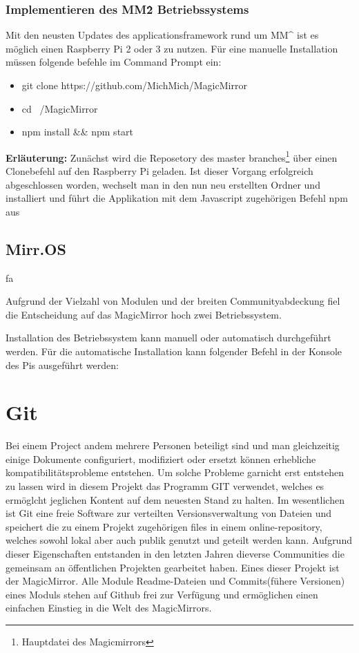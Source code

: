\documentclass[12pt,a4paper]{report}
\begin{document}
\subsubsection{Implementieren des MM\^2 Betriebssystems}
Mit den neusten Updates des applicationsframework rund um MM^\2 ist es möglich einen Raspberry Pi 2 oder 3 zu nutzen. Für eine manuelle Installation müssen folgende befehle im Command Prompt ein:
 
 \begin{itemize}
	 \item git clone https://github.com/MichMich/MagicMirror
	\item cd ~/MagicMirror
	\item npm install && npm start
 \end{itemize}
\newline
\textbf{Erläuterung:}
Zunächst wird die Reposetory des master branches\footnote{Hauptdatei des Magicmirrors} über einen Clonebefehl auf den Raspberry Pi geladen. Ist dieser Vorgang erfolgreich abgeschlossen worden, wechselt man in den nun neu erstellten Ordner und installiert und führt die Applikation mit dem Javascript zugehörigen Befehl npm aus 

\subsection*{Mirr.OS}
fa


Aufgrund der Vielzahl von Modulen und der breiten Communityabdeckung fiel die Entscheidung auf das MagicMirror hoch zwei Betriebssystem. 


Installation des Betriebssystem kann manuell oder automatisch durchgeführt werden. 
Für die automatische Installation kann folgender Befehl in der Konsole des Pis ausgeführt werden:

\section{Git}
Bei einem Project andem mehrere Personen beteiligt sind und man gleichzeitig einige Dokumente configuriert, modifiziert oder ersetzt können erhebliche kompatibilitätsprobleme entstehen. Um solche Probleme garnicht erst entstehen zu lassen wird in diesem Projekt das Programm GIT verwendet, welches es ermöglcht jeglichen Kontent auf dem neuesten Stand zu halten. Im wesentlichen ist Git eine freie Software zur verteilten Versionsverwaltung von Dateien und speichert die zu einem Projekt zugehörigen files in einem online-repository, welches sowohl lokal aber auch publik genutzt und geteilt werden kann. Aufgrund dieser Eigenschaften entstanden in den letzten Jahren dieverse Communities die gemeinsam an öffentlichen Projekten gearbeitet haben. Eines dieser Projekt ist der MagicMirror. Alle Module Readme-Dateien und Commits(fühere Versionen) eines Moduls stehen auf Github frei zur Verfügung und ermöglichen einen einfachen Einstieg in die Welt des MagicMirrors.
\end{document}
